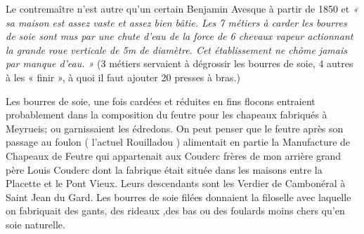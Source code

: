 Le contremaître n’est autre qu’un certain Benjamin Avesque à partir de 1850 et
\textit{« sa maison est assez vaste et assez bien bâtie. Les 7 métiers à carder les bourres de soie sont
mus par une chute d’eau de la force de 6 chevaux vapeur actionnant la grande roue
verticale de 5m de diamètre. Cet établissement ne chôme jamais par manque d’eau. »}
(3 métiers servaient à dégrossir les bourres de soie, 4 autres à les « finir », à quoi il faut
ajouter 20 presses à bras.)

\vspace{0.35cm}

Les bourres de soie, une fois cardées et réduites en fins flocons entraient probablement
dans la composition du feutre pour les chapeaux fabriqués à Meyrueis; ou garnissaient
les édredons. On peut penser que le feutre après son passage au foulon ( l’actuel
Rouilladou ) alimentait en partie la Manufacture de Chapeaux de Feutre qui appartenait
aux Couderc frères de mon arrière grand père Louis Couderc dont la fabrique était
située dans les maisons entre la Placette et le Pont Vieux. Leurs descendants sont les
Verdier de Cambonéral à Saint Jean du Gard. Les bourres de soie filées donnaient la
filoselle avec laquelle on fabriquait des gants, des rideaux ,des bas ou des foulards moins
chers qu’en soie naturelle.
